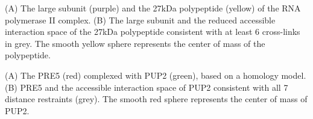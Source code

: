 \caption{}
{(A) The large subunit (purple) and the 27kDa polypeptide (yellow) of
the RNA polymerase II complex. (B) The large subunit and the reduced accessible
interaction space of the 27kDa polypeptide consistent with at least 6
cross-links in grey.  The smooth yellow sphere represents the center of mass of
the polypeptide.}
\stopbuffer


\caption{}
{(A) The PRE5 (red) complexed with PUP2 (green), based on a homology model.
(B) PRE5 and the accessible interaction space of PUP2 consistent with all 7
distance restraints (grey). The smooth red sphere represents the center of mass
of PUP2.}
\stopbuffer
